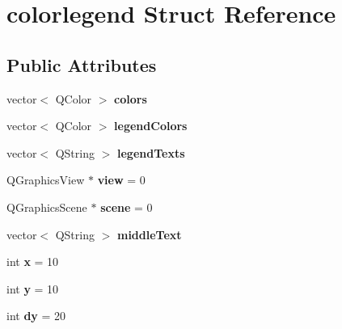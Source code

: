 \hypertarget{structcolorlegend}{}\section{colorlegend Struct Reference}
\label{structcolorlegend}
\subsection*{Public Attributes}
\begin{DoxyCompactItemize}
\item 
\mbox{\label{structcolorlegend_aa05ba34b8a727d3384895eb0f9001bd6}} 
vector$<$ Q\+Color $>$ {\bfseries colors}
\item 
\mbox{\label{structcolorlegend_a54650eb84d855ef0b101bf7ee812a21d}} 
vector$<$ Q\+Color $>$ {\bfseries legend\+Colors}
\item 
\mbox{\label{structcolorlegend_a5f9cd090d4945d61d47f3770cb74b703}} 
vector$<$ Q\+String $>$ {\bfseries legend\+Texts}
\item 
\mbox{\label{structcolorlegend_ad2368c7d968f741b26bcbda2dd8f70a6}} 
Q\+Graphics\+View $\ast$ {\bfseries view} = 0
\item 
\mbox{\label{structcolorlegend_a339875ad8a82a26c16e4af392f43b6c9}} 
Q\+Graphics\+Scene $\ast$ {\bfseries scene} = 0
\item 
\mbox{\label{structcolorlegend_ad37e2000b6e2e4934f0bca44bccae7f6}} 
vector$<$ Q\+String $>$ {\bfseries middle\+Text}
\item 
\mbox{\label{structcolorlegend_ad757d333f90013499ebf9ae126742105}} 
int {\bfseries x} = 10
\item 
\mbox{\label{structcolorlegend_a0b74d7f0218934d00a3acd6bf9910175}} 
int {\bfseries y} = 10
\item 
\mbox{\label{structcolorlegend_aec05cdbd8c0655353a87379cb53ea6b0}} 
int {\bfseries dy} = 20
\item 
\mbox{\label{structcolorlegend_aa1fd75c7c4ec26839d0e0d3943976fc0}} 

\end{DoxyCompactItemize}
